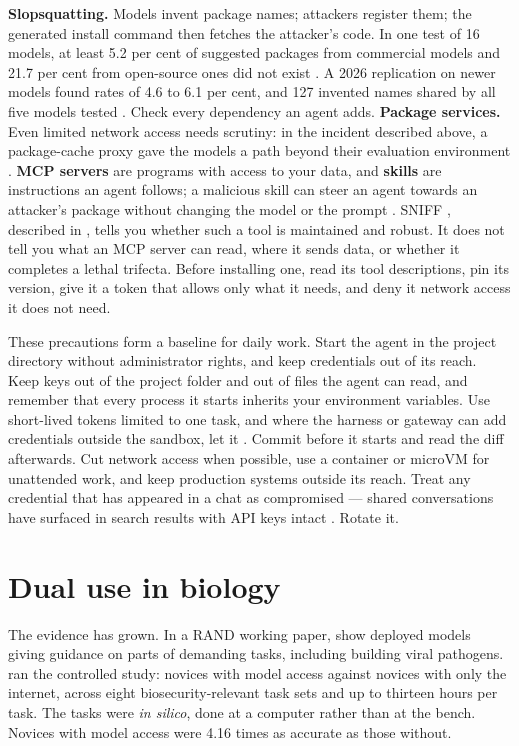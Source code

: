 \textbf{Slopsquatting.} Models invent package names; attackers register them;
the generated install command then fetches the attacker's code. In one test of
16 models, at least 5.2 per cent of suggested packages from commercial models and
21.7 per cent from open-source ones did not exist \parencite{spracklen2025packages}.
A 2026 replication on newer models found rates of 4.6 to 6.1 per cent, and 127
invented names shared by all five models tested \parencite{churilov2026packages}. Check every dependency an agent
adds. \textbf{Package services.} Even limited network access needs scrutiny:
in the incident described above, a package-cache proxy gave the models a path
beyond their evaluation environment \parencite{openai2026huggingface}.
\textbf{MCP servers} are programs with access to your data, and
\textbf{skills} are instructions an agent follows; a malicious skill can steer an
agent towards an attacker's package without changing the model or the prompt
\parencite{liu2026dependencysteering}. SNIFF \parencite{nagraj2026sniff},
described in , tells you whether such a tool is maintained and
robust. It does not tell you what an MCP server can read, where it sends data,
or whether it completes a lethal trifecta. Before installing one, read its tool
descriptions, pin its version, give it a token that allows only what it needs,
and deny it network access it does not need.

These precautions form a baseline for daily work. Start the agent in the
project directory without administrator rights, and keep credentials out of
its reach. Keep keys out of the project folder and out of  files the
agent can read, and remember that every process it starts inherits your
environment variables. Use short-lived tokens limited to one task, and where
the harness or gateway can add credentials outside the sandbox, let it
\parencite{anthropic2025sandboxing}. Commit before it starts and read the diff afterwards.
Cut network access when possible, use a container or microVM for unattended
work, and keep production systems outside its reach.
Treat any credential that has appeared in a chat as compromised --- shared
conversations have surfaced in search results with API keys intact
\parencite{ibtimes2026claudechats}. Rotate it.

\section{Dual use in biology}

The evidence has grown. In a RAND working paper, \textcite{brent2025bioweapons}
show deployed models giving guidance on parts of demanding tasks, including
building viral pathogens. \textcite{zhang2026uplift} ran the controlled study:
novices with model access against novices with only the internet, across eight
biosecurity-relevant task sets and up to thirteen hours per task. The tasks
were \emph{in silico}, done at a computer rather than at the bench. Novices
with model access were 4.16 times as accurate as those without.

